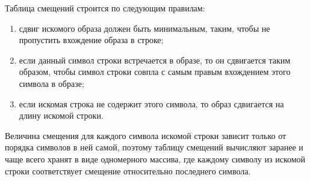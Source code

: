 Таблица смещений строится по следующим правилам:
\begin{enumerate}
    \item сдвиг искомого образа должен быть минимальным, таким, чтобы не пропустить вхождение образа в строке;
    \item если данный символ строки встречается в образе, то он сдвигается таким образом, чтобы символ строки совпла с самым правым вхождением этого символа в образе;
    \item если искомая строка не содержит этого символа, то образ сдвигается на длину искомой строки.
\end{enumerate}

Величина смещения для каждого символа искомой строки зависит только от порядка символов в ней самой, поэтому таблицу смещений вычисляют заранее и чаще всего хранят в виде одномерного массива, где каждому символу из искомой строки соответствует смещение относительно  последнего символа.


